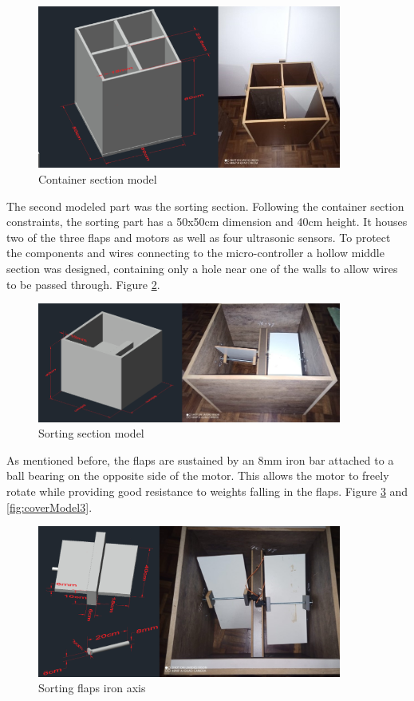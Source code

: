 \documentclass[a4paper,11pt]{article}
\begin{document}
\begin{figure}[H]
  \centering
  \includegraphics[width=10cm]{Figures/Container Block.png}
  \caption{\small{Container section model}}
  \label{fig:containerModel}
\end{figure}

The second modeled part was the sorting section. Following the container section constraints, the sorting part has a 50x50cm dimension and 40cm height. It houses two of the three flaps and motors as well as four ultrasonic sensors. To protect the components and wires connecting to the micro-controller a hollow middle section was designed, containing only a hole near one of the walls to allow wires to be passed through. Figure \ref{fig:sortingModel1}.

\begin{figure}[H]
  \centering
  \includegraphics[width=10cm]{Figures/Sorting1.png}
  \caption{\small{Sorting section model}}
  \label{fig:sortingModel1}
\end{figure}

As mentioned before, the flaps are sustained by an 8mm iron bar attached to a ball bearing on the opposite side of the motor. This allows the motor to freely rotate while providing good resistance to weights falling in the flaps.  Figure \ref{fig:sortingModel2} and \ref{fig:coverModel3}.

\begin{figure}[H]
  \centering
  \includegraphics[width=10cm]{Figures/Sorting2.png}
  \caption{\small{Sorting flaps iron axis}}
  \label{fig:sortingModel2}
\end{figure}
\end{document}
